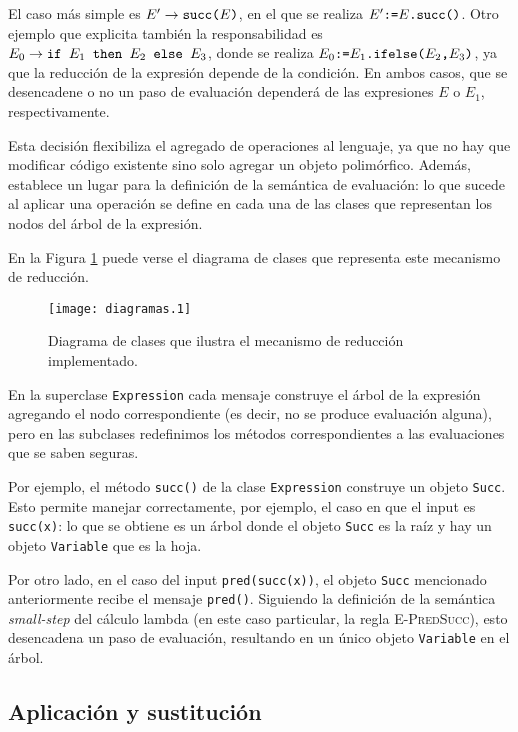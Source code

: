 \documentclass[11pt]{article}
\begin{document}
El caso más simple es $E' \rightarrow \verb|succ(|E\verb|)|$, en el que se realiza
$E' \verb|:=| E\verb|.succ()|$. Otro ejemplo que explicita también la responsabilidad es $E_0 \rightarrow \verb|if | E_1 \verb| then | E_2 \verb| else | E_3$, donde se realiza
$E_0 \verb|:=| E_1 \verb|.ifelse(| E_2 \verb|,| E_3 \verb|)|$, ya que la reducción de la expresión depende de la condición. En ambos casos, que se desencadene o no un paso de evaluación dependerá de las expresiones $E$ o $E_1$, respectivamente.

Esta decisión flexibiliza el agregado de operaciones al lenguaje, ya que no hay que modificar código existente sino solo agregar un objeto polimórfico. Además, establece un lugar para la definición de la semántica de evaluación: lo que sucede al aplicar una operación se define en cada una de las clases que representan los nodos del árbol de la expresión.

En la Figura \ref{fig:diagrama-clases} puede verse el diagrama de clases que representa este mecanismo de reducción.

\begin{figure}[h] \centering
\texttt{[image: diagramas.1]}
\caption{Diagrama de clases que ilustra el mecanismo de reducción
	implementado.}
\label{fig:diagrama-clases}
\end{figure}

En la superclase \lstinline|Expression| cada mensaje construye el árbol de la expresión agregando el nodo correspondiente (es decir, no se produce evaluación alguna), pero en las subclases redefinimos los métodos correspondientes a las evaluaciones que se saben seguras. 

Por ejemplo, el método \lstinline|succ()| de la clase \lstinline|Expression| construye un objeto \lstinline|Succ|. Esto permite manejar correctamente, por ejemplo, el caso en que el input es \verb|succ(x)|: lo que se obtiene es un árbol donde el objeto \lstinline|Succ| es la raíz y hay un objeto \lstinline|Variable| que es la hoja.

Por otro lado, en el caso del input \verb|pred(succ(x))|, el objeto
\lstinline|Succ| mencionado anteriormente recibe el mensaje
\lstinline|pred()|. Siguiendo la definición de la semántica
\emph{small-step} del cálculo lambda (en este caso particular, la regla
\textsc{E-PredSucc}), esto desencadena un paso de evaluación, resultando en
un único objeto \lstinline|Variable| en el árbol.

\subsection{Aplicación y sustitución}
\end{document}
